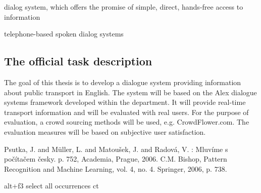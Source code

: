 
 dialog system, which offers the promise
of simple, direct, hands-free access to information

 telephone-based spoken dialog systems

\subsection{The official task description} %
\label{sub:the_official_task_description}


The goal of this thesis is to develop a dialogue system providing information about public transport in English. The system will be based on the Alex dialogue systems framework developed within the department. It will provide real-time transport information and will be evaluated with real users. For the purpose of evaluation, a crowd sourcing methods will be used, e.g. CrowdFlower.com. The evaluation measures will be based on subjective user satisfaction. 


Psutka, J. and Müller, L. and Matoušek, J. and Radová, V. : Mluvíme s počítačem česky. p. 752, Academia, Prague, 2006.
C.M. Bishop, Pattern Recognition and Machine Learning, vol. 4, no. 4. Springer, 2006, p. 738.

alt+f3 select all occurrences
ct